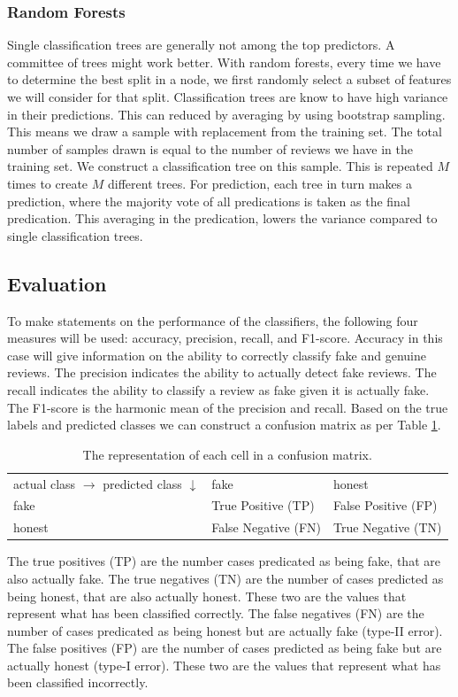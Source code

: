 \documentclass[a4paper,11pt]{article}
\begin{document}
\subsubsection{Random Forests}
Single classification trees are generally not among the top predictors. A committee of trees might work better. With random forests, every time we have to determine the best split in a node, we first randomly select a subset of features we will consider for that split. Classification trees are know to have high variance in their predictions. This can reduced by averaging by using bootstrap sampling. This means we draw a sample with replacement from the training set. The total number of samples drawn is equal to the number of reviews we have in the training set. We construct a classification tree on this sample. This is repeated $M$ times to create $M$ different trees. For prediction, each tree in turn makes a prediction, where the majority vote of all predications is taken as the final predication. This averaging in the predication, lowers the variance compared to single classification trees.

\subsection{Evaluation}
\label{section:evaluation}
To make statements on the performance of the classifiers, the following four measures will be used: accuracy, precision, recall, and F1-score. Accuracy in this case will give information on the ability to correctly classify fake and genuine reviews. The precision indicates the ability to actually detect fake reviews. The recall indicates the ability to classify a review as fake given it is actually fake. The F1-score is the harmonic mean of the precision and recall. Based on the true labels and predicted classes we can construct a confusion matrix as per Table \ref{table:conf_matrix}.
\begin{table}[ht]
\centering
\begin{tabular}{|l||l|l|}
\hline
 \shortstack{actual class $\rightarrow$ \\ predicted class $\downarrow$} & fake   & honest   \\
  \hhline{|=||=|=|}
fake & True Positive (TP) & False Positive (FP) \\
honest & False Negative  (FN) & True Negative (TN) \\
\hline
\end{tabular}
\caption{The representation of each cell in a confusion matrix.}
\label{table:conf_matrix}
\end{table}
The true positives (TP) are the number cases predicated as being fake, that are also actually fake. The true negatives (TN) are the number of cases predicted as being honest, that are also actually honest. These two are the values that represent what has been classified correctly. The false negatives (FN) are the number of cases predicated as being honest but are actually fake (type-II error). The false positives (FP) are the number of cases predicted as being fake but are actually honest (type-I error). These two are the values that represent what has been classified incorrectly.
\end{document}
